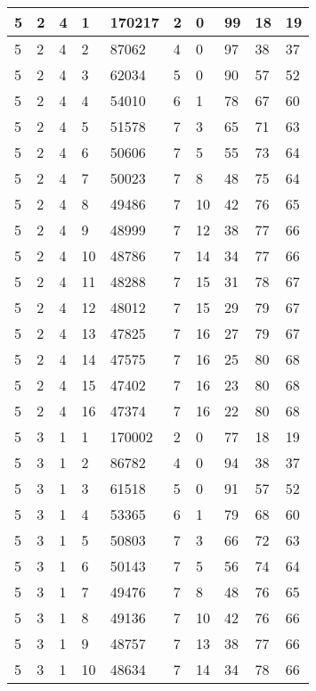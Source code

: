 \begin{table}[!ht]
\begin{tabular}{|l|l|l|l|l|l|l|l|l|l|}
        5 & 2 & 4 & 1 & 170217 & 2 & 0 & 99 & 18 & 19 \\ \hline
        5 & 2 & 4 & 2 & 87062 & 4 & 0 & 97 & 38 & 37 \\ \hline
        5 & 2 & 4 & 3 & 62034 & 5 & 0 & 90 & 57 & 52 \\ \hline
        5 & 2 & 4 & 4 & 54010 & 6 & 1 & 78 & 67 & 60 \\ \hline
        5 & 2 & 4 & 5 & 51578 & 7 & 3 & 65 & 71 & 63 \\ \hline
        5 & 2 & 4 & 6 & 50606 & 7 & 5 & 55 & 73 & 64 \\ \hline
        5 & 2 & 4 & 7 & 50023 & 7 & 8 & 48 & 75 & 64 \\ \hline
        5 & 2 & 4 & 8 & 49486 & 7 & 10 & 42 & 76 & 65 \\ \hline
        5 & 2 & 4 & 9 & 48999 & 7 & 12 & 38 & 77 & 66 \\ \hline
        5 & 2 & 4 & 10 & 48786 & 7 & 14 & 34 & 77 & 66 \\ \hline
        5 & 2 & 4 & 11 & 48288 & 7 & 15 & 31 & 78 & 67 \\ \hline
        5 & 2 & 4 & 12 & 48012 & 7 & 15 & 29 & 79 & 67 \\ \hline
        5 & 2 & 4 & 13 & 47825 & 7 & 16 & 27 & 79 & 67 \\ \hline
        5 & 2 & 4 & 14 & 47575 & 7 & 16 & 25 & 80 & 68 \\ \hline
        5 & 2 & 4 & 15 & 47402 & 7 & 16 & 23 & 80 & 68 \\ \hline
        5 & 2 & 4 & 16 & 47374 & 7 & 16 & 22 & 80 & 68 \\ \hline
        5 & 3 & 1 & 1 & 170002 & 2 & 0 & 77 & 18 & 19 \\ \hline
        5 & 3 & 1 & 2 & 86782 & 4 & 0 & 94 & 38 & 37 \\ \hline
        5 & 3 & 1 & 3 & 61518 & 5 & 0 & 91 & 57 & 52 \\ \hline
        5 & 3 & 1 & 4 & 53365 & 6 & 1 & 79 & 68 & 60 \\ \hline
        5 & 3 & 1 & 5 & 50803 & 7 & 3 & 66 & 72 & 63 \\ \hline
        5 & 3 & 1 & 6 & 50143 & 7 & 5 & 56 & 74 & 64 \\ \hline
        5 & 3 & 1 & 7 & 49476 & 7 & 8 & 48 & 76 & 65 \\ \hline
        5 & 3 & 1 & 8 & 49136 & 7 & 10 & 42 & 76 & 66 \\ \hline
        5 & 3 & 1 & 9 & 48757 & 7 & 13 & 38 & 77 & 66 \\ \hline
        5 & 3 & 1 & 10 & 48634 & 7 & 14 & 34 & 78 & 66 \\ \hline

\end{tabular}
\end{table}

